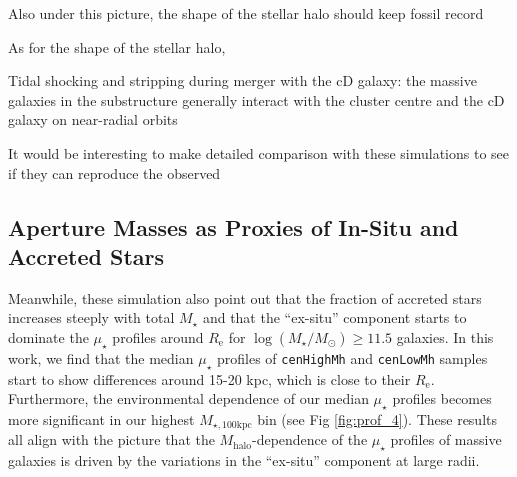 \documentclass[a4paper,fleqn,usenatbib]{mnras}
\def\rbcg{\texttt{cenHighMh}}
\def\nbcg{\texttt{cenLowMh}}
\def\mstar{{$M_{\star}$}}
\def\mhalo{{$M_{\mathrm{halo}}$}}
\def\logms{{$\log (M_{\star}/M_{\odot})$}}
\def\mtot{{$M_{\star,100\mathrm{kpc}}$}}
\def\mden{{$\mu_{\star}$}}
\begin{document}
    Also under this picture, the shape of the stellar halo should keep fossil record
    
    As for the shape of the stellar halo, 
    
    Tidal shocking and stripping during merger with the cD galaxy: the massive galaxies in the substructure generally interact with the cluster centre and the cD galaxy on near-radial orbits
    
    
    
    It would be interesting to make detailed comparison with these simulations to see
    if they can reproduce the observed 
    
    

\subsection{Aperture Masses as Proxies of In-Situ and Accreted Stars}
    \label{ssec:insitu}
    

    Meanwhile, these simulation also point out that the fraction of accreted stars 
    increases steeply with total \mstar{} and that the ``ex-situ'' component
    starts to dominate the \mden{} profiles around $R_{\mathrm{e}}$ for 
    \logms{}$\geq 11.5$ galaxies. 
    In this work, we find that the median \mden{} profiles of \rbcg{} and \nbcg{} 
    samples start to show differences around 15-20 kpc, which is close to 
    their $R_{\mathrm{e}}$. 
    Furthermore, the environmental dependence of our median \mden{} profiles 
    becomes more significant in our highest \mtot{} bin (see Fig \ref{fig:prof_4}). 
    These results all align with the picture that the \mhalo{}-dependence of the 
    \mden{} profiles of massive galaxies is driven by the variations in the 
    ``ex-situ'' component at large radii. 
   
\end{document}
